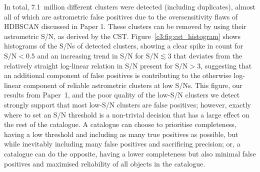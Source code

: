 In total, 7.1~million different clusters were detected (including duplicates), almost all of which are astrometric false positives due to the oversensitivity flaws of HDBSCAN discussed in Paper 1. These clusters can be removed by using their astrometric S/N, as derived by the CST. Figure~\ref{c3:fig:cst_histogram} shows histograms of the S/Ns of detected clusters, showing a clear spike in count for $\text{S/N}<0.5$ and an increasing trend in S/N for $\text{S/N} \lesssim 3$ that deviates from the relatively straight log-linear relation in S/N present for $\text{S/N}>3$, suggesting that an additional component of false positives is contributing to the otherwise log-linear component of reliable astrometric clusters at low S/Ns. This figure, our results from Paper~1, and the poor quality of the low-S/N clusters we detect strongly support that most low-S/N clusters are false positives; however, exactly where to set an S/N threshold is a non-trivial decision that has a large effect on the rest of the catalogue. A catalogue can choose to prioritise completeness, having a low threshold and including as many true positives as possible, but while inevitably including many false positives and sacrificing precision; or, a catalogue can do the opposite, having a lower completeness but also minimal false positives and maximised reliability of all objects in the catalogue.

